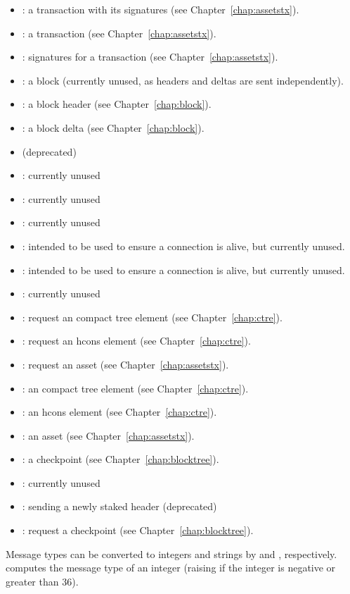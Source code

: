 \begin{itemize}
\item {}: a transaction with its signatures (see Chapter~\ref{chap:assetstx}).
\item {}: a transaction (see Chapter~\ref{chap:assetstx}).
\item {}: signatures for a transaction (see Chapter~\ref{chap:assetstx}).
\item {}: a block (currently unused, as headers and deltas are sent independently).
\item {}: a block header (see Chapter~\ref{chap:block}).
\item {}: a block delta (see Chapter~\ref{chap:block}).
\item {} (deprecated)
\item {}: currently unused
\item {}: currently unused
\item {}: currently unused
\item {}: intended to be used to ensure a connection is alive, but currently unused.
\item {}: intended to be used to ensure a connection is alive, but currently unused.
\item {}: currently unused
\item {}: request an compact tree element (see Chapter~\ref{chap:ctre}).
\item {}: request an hcons element (see Chapter~\ref{chap:ctre}).
\item {}: request an asset (see Chapter~\ref{chap:assetstx}).
\item {}: an compact tree element (see Chapter~\ref{chap:ctre}).
\item {}: an hcons element (see Chapter~\ref{chap:ctre}).
\item {}: an asset (see Chapter~\ref{chap:assetstx}).
\item {}: a checkpoint (see Chapter~\ref{chap:blocktree}).
\item {}: currently unused
\item {}: sending a newly staked header (deprecated)
\item {}: request a checkpoint (see Chapter~\ref{chap:blocktree}).
\end{itemize}
Message types can be converted to integers and strings by {}
and {}, respectively.
{} computes the message type of an integer (raising {}
if the integer is negative or greater than 36).

